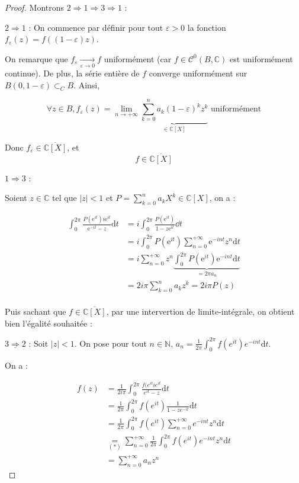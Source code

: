 \begin{proof} Montrons $2 \Rightarrow 1 \Rightarrow 3 \Rightarrow 1$ :


\underline{$2\Rightarrow 1$} : On commence par définir pour tout $\varepsilon > 0 $ la fonction $f_\varepsilon(z) = f((1-\varepsilon)z)$.

On remarque que $f_\varepsilon \xrightarrow[\varepsilon \to 0]{} f $ uniformément (car $f \in \mathcal{C}^0(B,\mathbb{C})$ est uniformément continue).
De plus, la série entière de $f$ converge uniformément sur $B(0,1-\varepsilon) \subset_C B$. Ainsi, 

$$\forall z \in B, f_\varepsilon(z) = \lim_{n \to +\infty} \underbrace{\sum_{k=0}^n a_k(1-\varepsilon)^k z^k}_{\in \mathbb{C}[X]} \text{ uniformément}$$

Donc $f_\varepsilon \in \overline{\mathbb{C}[X]}$, et 
$$f \in \overline{\mathbb{C}[X]}$$
 
\underline{$1\Rightarrow 3$} :

Soient $z \in \mathbb{C}$ tel que $|z|<1$ et $P = \sum_{k=0}^n a_k X^k \in \mathbb{C}[X]$, on a :
 
\newcommand\eit{\text{e}^{it}}
	\begin{align*}
		\int_{0}^{2\pi} \frac{P\left( \text{e}^{it} \right) i \text{e}^{it}}{\text{e}^{-it} -z} \mathrm{d} t &= i \int_{0}^{2\pi} \frac{P\left( \eit \right) }{1 - z \eit} \dd t  \\
		&= i \int_{0}^{2 \pi} P\left( \eit \right) \sum_{n = 0}^{+\infty} \text{e}^{-int} z^n \mathrm{d} t   \\
		&= i \sum_{n=0}^{+\infty} z^n \underbrace{\int_{0}^{2 \pi} P\left(  \eit \right) \text{e}^{-int} \mathrm{d} t}_{=2\pi a_n}   \\
		&= 2 i \pi \sum_{k=0}^{n} a_k z^k = 2 i \pi P\left( z \right)  \\
	\end{align*}

Puis sachant que $f \in \overline{\mathbb{C}[X]}$, par une intervertion de limite-intégrale, on obtient bien l'égalité souhaitée : 

$\underline{3\Rightarrow 2}$ :
	Soit $|z| <1$. On pose  pour tout $n \in \mathbb{N}$, $a_n = \frac{1}{2\pi}\int_0^{2 \pi} f(e^{it})e^{-int}\mathrm{d}t$.

On a :

\begin{align*}
    f(z) &= \frac{1}{2i\pi} \int_0^{2\pi} \frac{f(e^{it}ie^{it}}{e^{it}-z} \mathrm{d}t\\
    &= \frac{1}{2\pi}\int_0^{2\pi} f(e^{it}) \frac{1}{1-ze^{-it}} \mathrm{d}t \\
    &= \frac{1}{2\pi}\int_0^{2\pi} f(e^{it})\sum_{n=0}^{+\infty}e^{-int}z^n \mathrm{d}t \\
    &\underset{(*)}{=} \sum_{n=0}^{+\infty} \frac{1}{2\pi} \int_{0}^{2\pi} f(e^{it}) e^{-int} z^n \mathrm{d}t \\
    &= \sum_{n=0}^{+\infty} a_n z^n
\end{align*}


\end{proof}
